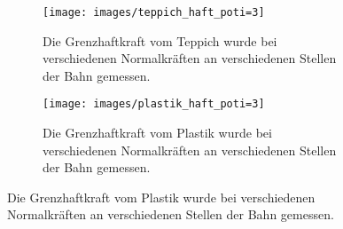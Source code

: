 \begin{figure}[H]
    \centering
    \begin{subfigure}{.7\textwidth}
        \texttt{[image: images/teppich\_haft\_poti=3]}
        \caption{Die Grenzhaftkraft vom Teppich wurde bei verschiedenen Normalkr\"aften an verschiedenen Stellen der Bahn gemessen.}
        \label{fig:teppich_haft_poti=3}
    \end{subfigure}
    \begin{subfigure}{.7\textwidth}
        \texttt{[image: images/plastik\_haft\_poti=3]}
        \caption{Die Grenzhaftkraft vom Plastik wurde bei verschiedenen Normalkr\"aften an verschiedenen Stellen der Bahn gemessen.}
        \label{fig:plastik_haft_poti=3}
    \end{subfigure}
\end{figure}

